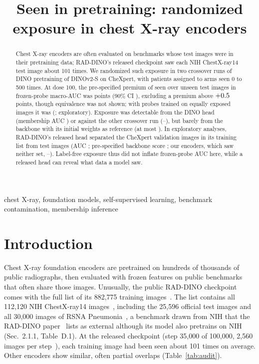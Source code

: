 \documentclass{article}
\title{Seen in pretraining: randomized exposure in chest X-ray encoders}
\begin{document}
\maketitle
\begin{abstract}
Chest X-ray encoders are often evaluated on benchmarks whose test images were in their pretraining data; RAD-DINO's released checkpoint saw each NIH ChestX-ray14 test image about 101 times. We randomized such exposure in two crossover runs of DINO pretraining of DINOv2-S on CheXpert, with patients assigned to arms seen 0 to 500 times. At dose 100, the pre-specified premium of seen over unseen test images in frozen-probe macro-AUC was \PrimDelta{} points (90\% CI \PrimCI), excluding a premium above $+0.5$ points, though equivalence was not shown; with probes trained on equally exposed images it was \MatchedDelta{} (\MatchedCI; exploratory). Exposure was detectable from the DINO head (membership AUC \CEHundred) or against the other crossover run (\TwinTwo--\TwinOne), but barely from the backbone with its initial weights as reference (at most \AuditorMax). In exploratory analyses, RAD-DINO's released head separated the CheXpert validation images in its training list from test images (AUC \RadHead; pre-specified backbone score \RadBackbone; our encoders, which saw neither set, \CtlTwo--\CtlOne). Label-free exposure thus did not inflate frozen-probe AUC here, while a released head can reveal what data a model saw.
\end{abstract}
\begin{keywords}
chest X-ray, foundation models, self-supervised learning, benchmark contamination, membership inference
\end{keywords}

\section{Introduction}\label{sec:intro}
Chest X-ray foundation encoders are pretrained on hundreds of thousands of public radiographs, then evaluated with frozen features on public benchmarks that often share those images. Unusually, the public RAD-DINO checkpoint comes with the full list of its 882{,}775 training images~\cite{microsoft2024raddinocard}. The list contains all 112{,}120 NIH ChestX-ray14 images~\cite{wang2017chestxray8}, including the 25{,}596 official test images and all 30{,}000 images of RSNA Pneumonia~\cite{shih2019rsna}, a benchmark drawn from NIH that the RAD-DINO paper~\cite{perezgarcia2025raddino} lists as external although its model also pretrains on NIH (Sec.~2.1.1, Table~D.1). At the released checkpoint (step 35{,}000 of 100{,}000, 2{,}560 images per step~\cite{microsoft2024raddinocard}), each training image had been seen about 101 times on average. Other encoders show similar, often partial overlaps (Table~\ref{tab:audit}).
\end{document}
